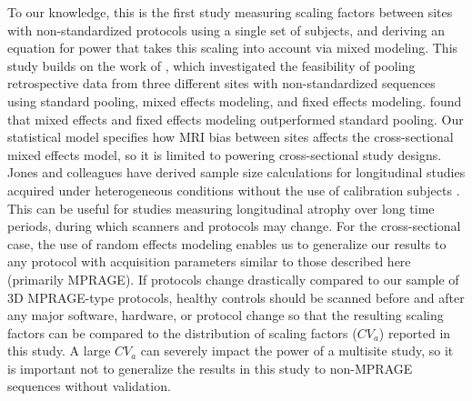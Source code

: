 To our knowledge, this is the first study measuring scaling factors between sites with non-standardized protocols using a single set of subjects, and deriving an equation for power that takes this scaling into account via mixed modeling. This study builds on the work of \cite{fennema2007feasibility}, which investigated the feasibility of pooling retrospective data from three different sites with non-standardized sequences using standard pooling, mixed effects modeling, and fixed effects modeling. \cite{fennema2007feasibility} found that mixed effects and fixed effects modeling outperformed standard pooling. Our statistical model specifies how MRI bias between sites affects the cross-sectional mixed effects model, so it is limited to powering cross-sectional study designs. Jones and colleagues have derived sample size calculations for longitudinal studies acquired under heterogeneous conditions without the use of calibration subjects \cite{jones2013quantification}. This can be useful for studies measuring longitudinal atrophy over long time periods, during which scanners and protocols may change. For the cross-sectional case, the use of random effects modeling enables us to generalize our results to any protocol with acquisition parameters similar to those described here (primarily MPRAGE). If protocols change drastically compared to our sample of 3D MPRAGE-type protocols, healthy controls should be scanned before and after any major software, hardware, or protocol change so that the resulting scaling factors can be compared to the distribution of scaling factors ($CV_a$) reported in this study. A large $CV_a$ can severely impact the power of a multisite study, so it is important not to generalize the results in this study to non-MPRAGE sequences without validation.
